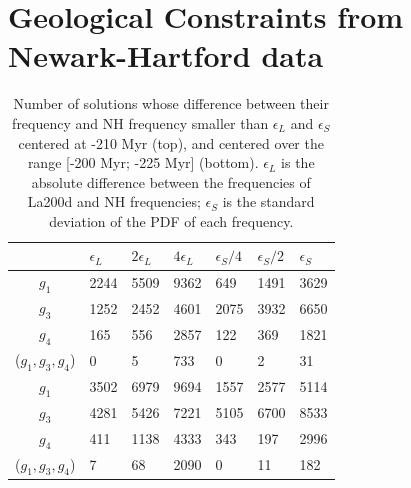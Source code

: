 \documentclass[12pt]{article}
\begin{document}
	\section{Geological Constraints from Newark-Hartford data} \label{sec:geo_con}
	
	\begin{table}
		\centering
		\begin{tabular}{cllllll}
			{} &   $\epsilon_L$ &   $2\epsilon_L$ &   $4\epsilon_L$ &   $\epsilon_S/4$ &   $\epsilon_S/2$ &   $\epsilon_S$  \\
			\midrule
			$g_1$                &  2244 &  5509 &  9362  &  649 &   1491 &  3629   \\
			$g_3$                 &  1252 &  2452 &  4601  &  2075&   3932 &  6650  \\
			$g_4$                 &  165  &  556  &  2857  &  122 &   369  &  1821    \\
			($g_1, g_3, g_4$)   &  0    &  5    &  733   &  0   &   2    &  31   \\
			\midrule
			$g_1$                &  3502 &  6979 &  9694  &  1557 &   2577 &  5114   \\
			$g_3$                 &  4281 &  5426 &  7221  &  5105 &   6700 &  8533 \\
			$g_4$                 &  411  &  1138 &  4333  &  343  &   197  &  2996    \\
			($g_1, g_3, g_4$)   &  7    &  68    &  2090  &  0   &   11   &  182   \\
			\bottomrule
		\end{tabular}
		\caption{Number of solutions whose difference between their frequency and NH frequency smaller than $\epsilon_L$ and $\epsilon_S$ centered at -210 Myr (top), and centered over the range [-200 Myr; -225 Myr] (bottom). $\epsilon_L$ is the absolute difference between the frequencies of La200d and NH frequencies; $\epsilon_S$ is the standard deviation of the PDF of each frequency.}
		\label{table:epsilon}
	\end{table}
\end{document}
